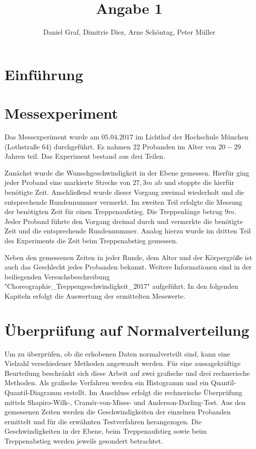 
 
\title{Angabe 1}
\providecommand{\subtitle}[1]{}
\subtitle{Untertitel}
\author{Daniel Graf, Dimitrie Diez, Arne Schöntag, Peter Müller}
\date{}


\maketitle


\tableofcontents

\section{Einführung}


\section{Messexperiment}

Das Messexperiment wurde am $05.04.2017$ im Lichthof der Hochschule München (Lothstraße 64) durchgeführt. Es nahmen $22$ Probanden im Alter von $20-29$ Jahren teil. Das Experiment bestand aus drei Teilen. 

Zunächst wurde die Wunschgeschwindigkeit in der Ebene gemessen. Hierfür ging jeder Proband eine markierte Strecke von $27,3m$ ab und stoppte die hierfür benötigte Zeit. Anschließend wurde dieser Vorgang zweimal wiederholt und die entsprechende Rundennummer vermerkt. Im zweiten Teil erfolgte die Messung der benötigten Zeit für einen Treppenaufstieg. Die Treppenlänge betrug $9m$. Jeder Proband führte den Vorgang dreimal durch und vermerkte die benötigte Zeit und die entsprechende Rundennummer. Analog hierzu wurde im dritten Teil des Experiments die Zeit beim Treppenabstieg gemessen. 

Neben den gemessenen Zeiten in jeder Runde, dem Alter und der Körpergröße ist auch das Geschlecht jedes Probanden bekannt. Weitere Informationen sind in der beiliegenden Versuchsbeschreibung "Choreographie\_Treppengeschwindigkeit\_2017" aufgeführt. In den folgenden Kapiteln erfolgt die Auswertung der ermittelten Messwerte.

\section{Überprüfung auf Normalverteilung}

Um zu überprüfen, ob die erhobenen Daten normalverteilt sind, kann eine Vielzahl verschiedener Methoden angewandt werden. Für eine aussagekräftige Beurteilung beschränkt sich diese Arbeit auf zwei grafische und drei rechnerische Methoden. Als grafische Verfahren werden ein Histogramm und ein Quantil-Quantil-Diagramm erstellt. Im Anschluss erfolgt die rechnerische Überprüfung mittels Shapiro-Wilk-, Cramér-von-Mises- und Anderson-Darling-Test. Aus den gemessenen Zeiten werden die Geschwindigkeiten der einzelnen Probanden ermittelt und für die erwähnten Testverfahren herangezogen. Die Geschwindigkeiten in der Ebene, beim Treppenaufstieg sowie beim Treppenabstieg werden jeweils gesondert betrachtet.


